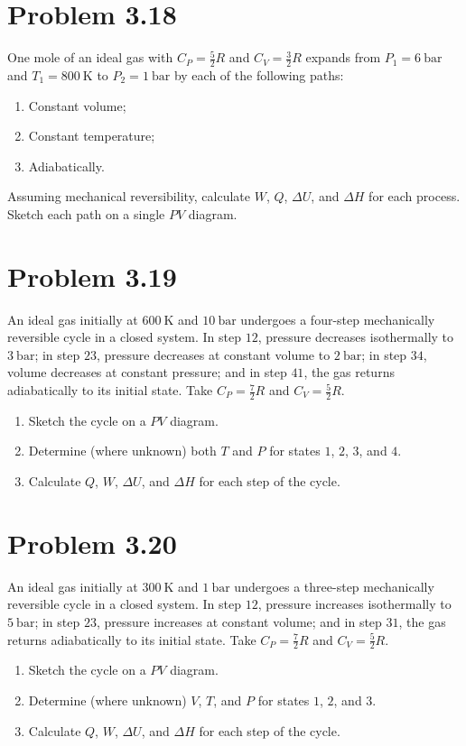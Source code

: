 \documentclass{article}
\begin{document}
\section*{Problem 3.18}
One mole of an ideal gas with $C_P = \frac{5}{2}R$ and $C_V =
\frac{3}{2}R$ expands from $P_1 = \SI{6}{\bar}$ and $T_1 =
\SI{800}{\kelvin}$ to $P_2 = \SI{1}{\bar}$ by each of the following paths:
\begin{enumerate}[label=(\alph*)]
  \item Constant volume;
  \item Constant temperature;
  \item Adiabatically.
\end{enumerate}
Assuming mechanical reversibility, calculate $W$, $Q$, $\Delta U$,
and $\Delta H$ for each process. Sketch each path on a single $PV$ diagram.

\section*{Problem 3.19}
An ideal gas initially at $\SI{600}{\kelvin}$ and $\SI{10}{\bar}$
undergoes a four-step mechanically reversible cycle in a closed
system. In step $12$, pressure decreases isothermally to
$\SI{3}{\bar}$; in step $23$, pressure decreases at constant volume
to $\SI{2}{\bar}$; in step $34$, volume decreases at constant
pressure; and in step $41$, the gas returns adiabatically to its
initial state. Take $C_P = \frac{7}{2}R$ and $C_V = \frac{5}{2}R$.
\begin{enumerate}[label=(\alph*)]
  \item Sketch the cycle on a $PV$ diagram.
  \item Determine (where unknown) both $T$ and $P$ for states $1$, $2$,
    $3$, and $4$.
  \item Calculate $Q$, $W$, $\Delta U$, and $\Delta H$ for each step
    of the cycle.
\end{enumerate}

\section*{Problem 3.20}
An ideal gas initially at $\SI{300}{\kelvin}$ and $\SI{1}{\bar}$
undergoes a three-step mechanically reversible cycle in a closed
system. In step $12$, pressure increases isothermally to
$\SI{5}{\bar}$; in step $23$, pressure increases at constant volume;
and in step $31$, the gas returns adiabatically to its initial state.
Take $C_P = \frac{7}{2}R$ and $C_V = \frac{5}{2}R$.
\begin{enumerate}[label=(\alph*)]
  \item Sketch the cycle on a $PV$ diagram.
  \item Determine (where unknown) $V$, $T$, and $P$ for states $1$,
    $2$, and $3$.
  \item Calculate $Q$, $W$, $\Delta U$, and $\Delta H$ for each step
    of the cycle.
\end{enumerate}
\end{document}
